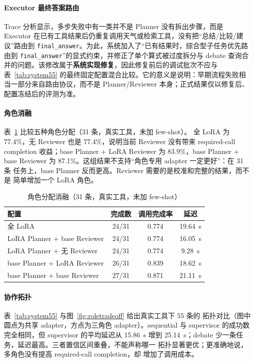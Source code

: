 \documentclass[UTF8,a4paper,12pt]{ctexart}
\begin{document}
\paragraph{Executor 最终答案路由}
Trace 分析显示，多步失败中有一类并不是 Planner 没有拆出步骤，而是 Executor 在已有工具结果后仍重复调用天气或检索工具，没有把“总结/比较/建议”路由到 \texttt{final\_answer}。为此，系统加入了“已有结果时，综合型子任务优先路由到 \texttt{final\_answer}”的显式约束，并修正了单个算式被过度拆分与 debate 查询合并的问题。该修改属于\textbf{系统实现修复}，因此修复前后的调试批次不应与表~\ref{tab:system55} 的最终固定配置混合比较。它的意义是说明：早期流程失败相当一部分来自路由协议，而不是 Planner/Reviewer 本身；正式结果仅以修复后、配置冻结后的评测为准。

\paragraph{角色消融}
表~\ref{tab:role} 比较五种角色分配（31 条，真实工具，未加 few-shot）。
全 LoRA 为 77.4\%，无 Reviewer 也是 77.4\%，说明当前 Reviewer 没有带来
required-call completion 收益；base Planner + LoRA Reviewer 为 83.9\%，base Planner + base
Reviewer 为 87.1\%。这组结果不支持“角色专用 adapter 一定更好”：在 31 条
任务上，base Planner 反而更高。Reviewer 需要的是校准和完整的结果，而不是
简单增加一个 LoRA 角色。

\begin{table}[H]
  \centering
  \small
  \caption{角色分配消融（31 条，真实工具，未加 few-shot）}
  \label{tab:role}
  \begin{tabular}{lccc}
    \toprule
    配置 & 完成数 & 调用完成率 & 延迟 \\
    \midrule
    全 LoRA & 24/31 & 0.774 & 19.64~s \\
    LoRA Planner + base Reviewer & 24/31 & 0.774 & 16.05~s \\
    LoRA Planner + 无 Reviewer & 24/31 & 0.774 & 9.28~s \\
    base Planner + LoRA Reviewer & 26/31 & 0.839 & 18.62~s \\
    base Planner + base Reviewer & 27/31 & 0.871 & 21.11~s \\
    \bottomrule
  \end{tabular}
\end{table}

\paragraph{协作拓扑}
表~\ref{tab:system55} 与图~\ref{fig:roletradeoff} 给出真实工具下 55 条的
拓扑对比（图中圆点为共享 adapter，方点为三角色 adapter）。sequential 与
supervisor 的成功数完全相同，但 supervisor 的平均延迟从 15.86~s 增到
25.14~s；debate 少一条任务，延迟最高。三者置信区间重叠，不能声称哪一
拓扑显著更优；更准确地说，多角色没有提高 required-call completion，却
增加了调用成本。
\end{document}
